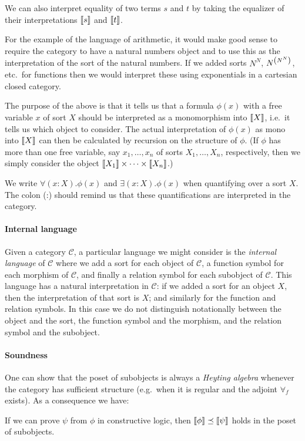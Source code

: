 We can also interpret equality of two terms \(s\) and \(t\) by taking the
equalizer of their interpretations \(\sem{s}\) and \(\sem{t}\).

For the example of the language of arithmetic, it would make good sense to
require the category to have a natural numbers object and to use this as the
interpretation of the sort of the natural numbers.
%
If we added sorts \(N^N\), \(N^{\pa*{N^N}}\), etc.\ for functions then we would
interpret these using exponentials in a cartesian closed category.

The purpose of the above is that it tells us that a formula \(\phi(x)\) with a
free variable \(x\) of sort \(X\) should be interpreted as a monomorphism into
\(\sem{X}\), i.e.\ it tells us which object to consider.
%
The actual interpretation of \(\phi(x)\) as mono into \(\sem{X}\) can then be
calculated by recursion on the structure of \(\phi\).
%
(If \(\phi\) has more than one free variable, say \(x_1,\dots,x_n\) of sorts
\(X_1,\dots,X_n\), respectively, then we simply consider the object
\(\sem{X_1} \times \cdots \times \sem{X_n}\).)

We write \(\forall(x : X).\phi(x)\) and \(\exists(x : X).\phi(x)\) when
quantifying over a sort \(X\). The colon (:) should remind us that
these quantifications are interpreted in the category.

\paragraph{Internal language}
Given a category \(\mathcal C\), a particular language we might consider is the
\emph{internal language} of \(\mathcal C\) where we add a sort for each object
of \(\mathcal C\), a function symbol for each morphism of \(\mathcal C\),
and finally a relation symbol for each subobject of \(\mathcal C\).
%
This language has a natural interpretation in \(\mathcal C\): if we added a sort
for an object \(X\), then the interpretation of that sort is \(X\); and
similarly for the function and relation symbols.
%
In this case we do not distinguish notationally between the object and the sort,
the function symbol and the morphism, and the relation symbol and the subobject.

\paragraph{Soundness}
One can show that the poset of subobjects is always a \emph{Heyting algebra}
whenever the category has sufficient structure (e.g.\ when it is regular and the
adjoint \(\forall_f\) exists).
%
As a consequence we have:
\begin{theorem*}
  If we can prove \(\psi\) from \(\phi\) in constructive logic, then
  \(\sem{\phi} \preceq \sem{\psi}\) holds in the poset of subobjects.
\end{theorem*}

